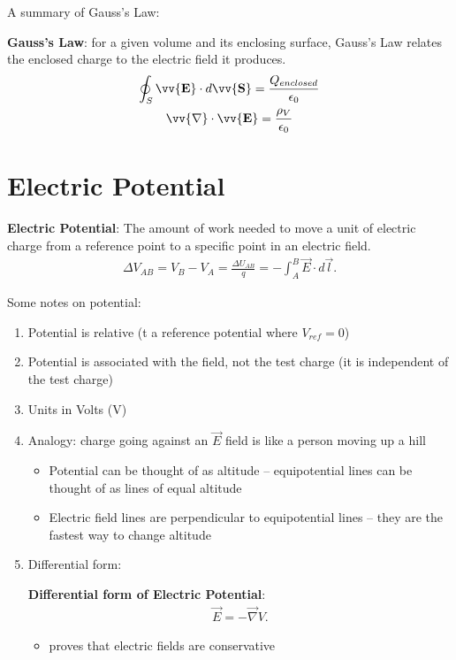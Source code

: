 \documentclass[10pt]{article}
\begin{document}
A summary of Gauss's Law:
\begin{theorem}
    \textbf{Gauss's Law}: for a given volume and its enclosing surface, Gauss's Law relates the enclosed charge to the electric field it produces.
    \begin{gather}
        \oint_S \vv{\mathbf{E}} \cdot d \vv{\mathbf{S}} = \frac{Q_{enclosed}}{\epsilon_0} \\ 
        \vv{\mathbf{\nabla}} \cdot \vv{\mathbf{E}} = \frac{\rho_V}{\epsilon_0}       
    \end{gather}    
\end{theorem}


\section{Electric Potential}
\begin{definition}
    \textbf{Electric Potential}: The amount of work needed to move a unit of electric charge from a reference point to a specific point in an electric field.
    \begin{align*}
        \Delta V_{AB} = V_B - V_A = \frac{\Delta U_{AB}}{q} = - \int_{A}^{B} \vec{E} \cdot d\vec{l}
    .\end{align*}
\end{definition}
Some notes on potential:
\begin{enumerate}
    \item Potential is relative (t a reference potential where $V_{ref} = 0$)
    \item Potential is associated with the field, not the test charge (it is independent of the test charge)
    \item Units in Volts (V)
    \item Analogy: charge going against an $\vec{E}$ field is like a person moving up a hill
        \begin{itemize}
            \item Potential can be thought of as altitude -- equipotential lines can be thought of as lines of equal altitude
            \item Electric field lines are perpendicular to equipotential lines -- they are the fastest way to change altitude
        \end{itemize}
    \item Differential form:
        \begin{definition}
            \textbf{Differential form of Electric Potential}:
            \begin{align*}
                \vec{E} = - \vec{\nabla} V
            .\end{align*}
            \begin{itemize}
                \item proves that electric fields are conservative
            \end{itemize}
        \end{definition}
\end{enumerate}
\end{document}
